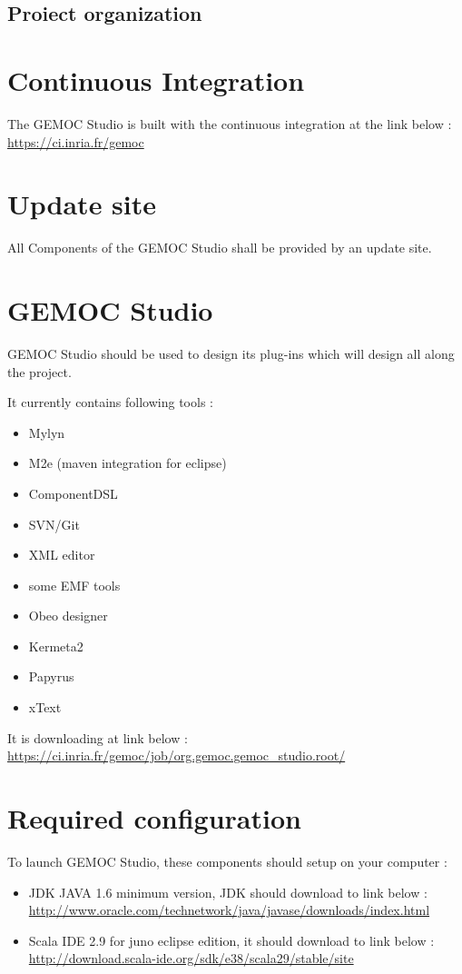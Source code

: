 \documentclass{gemoc} %
\begin{document}
\subsection{Proiect organization}
\section{Continuous Integration}
The GEMOC Studio is built with the continuous integration at the link below :
\newline\url{https://ci.inria.fr/gemoc} 
\section{Update site}
All Components of the GEMOC Studio shall be provided by an update site.
\section{GEMOC Studio}
GEMOC Studio should be used to design its plug-ins which will design all along the project.

It currently contains following tools :
\begin{itemize}
	\item Mylyn
	\item M2e (maven integration for eclipse)
	\item ComponentDSL
	\item SVN/Git
	\item XML editor
	\item some EMF tools
	\item Obeo designer
	\item Kermeta2
	\item Papyrus
	\item xText
\end{itemize}
It is downloading at link below :
\newline
\url {https://ci.inria.fr/gemoc/job/org.gemoc.gemoc_studio.root/}
\section{Required configuration}
To launch GEMOC Studio, these components should setup on your computer :
\begin{itemize}
	\item JDK JAVA 1.6 minimum version, JDK should download to link below :
	\newline
	\url {http://www.oracle.com/technetwork/java/javase/downloads/index.html}
	\item Scala IDE 2.9 for juno eclipse edition, it should download to link below :
	\newline
	\url {http://download.scala-ide.org/sdk/e38/scala29/stable/site}
\end{itemize}
\end{document}
